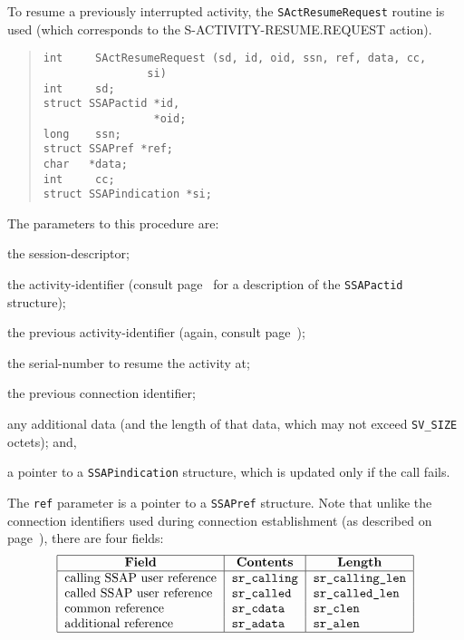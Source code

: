 To resume a previously interrupted activity,
the \verb"SActResumeRequest" routine is used
(which corresponds to the {\sf S-ACTIVITY-RESUME.REQUEST\/} action).
\begin{quote}\small\begin{verbatim}
int     SActResumeRequest (sd, id, oid, ssn, ref, data, cc,
                si)
int     sd;
struct SSAPactid *id,
                 *oid;
long    ssn;
struct SSAPref *ref;
char   *data;
int     cc;
struct SSAPindication *si;
\end{verbatim}\end{quote}
The parameters to this procedure are:
\begin{describe}
\item[\verb"sd":] the session-descriptor;

\item[\verb"id":] the activity-identifier
(consult page~\pageref{SSAPactid} for a description of the \verb"SSAPactid"
structure);

\item[\verb"oid":] the previous activity-identifier
(again, consult page~\pageref{SSAPactid});

\item[\verb"ssn":] the serial-number to resume the activity at;

\item[\verb"ref":] the previous connection identifier;

\item[\verb"data"/\verb"cc":] any additional data
(and the length of that data, which may not exceed \verb"SV_SIZE" octets);
and,

\item[\verb"si":] a pointer to a \verb"SSAPindication" structure, which is
updated only if the call fails.
\end{describe}

The \verb"ref" parameter is a pointer to a \verb"SSAPref" structure.
Note that unlike the connection identifiers used during connection
establishment (as described on page~\pageref{SSAPref}),
there are four fields:\label{SSAPactref}
\[\begin{tabular}{|l|l|l|}
\hline
    \multicolumn{1}{|c|}{\bf Field}&
    \multicolumn{1}{c|}{\bf Contents}&
    \multicolumn{1}{c|}{\bf Length}\\
\hline
    calling SSAP user reference&
			\tt sr\_calling&	\tt sr\_calling\_len\\
    called SSAP user reference&
			\tt sr\_called&	\tt sr\_called\_len\\
    common reference&
			\tt sr\_cdata&	\tt sr\_clen\\
    additional reference&
			\tt sr\_adata&	\tt sr\_alen\\
\hline
\end{tabular}\]

